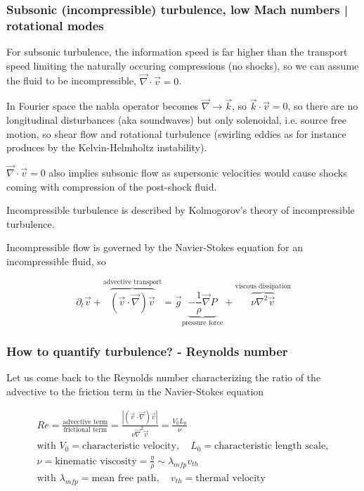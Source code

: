 \subsubsection{Subsonic (incompressible) turbulence, low Mach numbers | rotational modes}
For subsonic turbulence, the information speed is far higher than the transport speed limiting
the naturally occuring compressions (no shocks), so we can assume the fluid to be incompressible, $\vec{\nabla} \cdot \vec{v} = 0$.

In Fourier space the nabla operator becomes $\vec{\nabla} \rightarrow \vec{k}$, so $\vec{k} \cdot \vec{v} = 0$, so there
are no longitudinal disturbances (aka soundwaves) but only solenoidal, i.e. source free motion, so shear flow and rotational turbulence
(swirling eddies as for instance produces by the Kelvin-Helmholtz instability).

$\vec{\nabla} \cdot \vec{v} = 0$ also implies subsonic flow as supersonic velocities would cause shocks coming with compression of the post-shock fluid.

\textcolor{blue1}{Incompressible turbulence is described by Kolmogorov's theory of incompressible turbulence}.

Incompressible flow is governed by the Navier-Stokes equation for an incompressible fluid, so

\begin{equation}
    \partial_t \vec{v} + \overbrace{(\vec{v} \cdot \vec{\nabla}) \vec{v}}^{\text{advective transport}} = \vec{g} \underbrace{- \frac{1}{\rho} \vec{\nabla} P}_{\text{pressure force}} + \overbrace{\nu \nabla^2 \vec{v}}^{\text{viscous dissipation}}
\end{equation}

\subsubsection{How to quantify turbulence? - Reynolds number}
Let us come back to the Reynolds number characterizing the ratio of the advective to the friction term in the Navier-Stokes equation

\begin{equation}
    \begin{gathered}
        Re = \frac{\text{advective term}}{\text{frictional term}} = \frac{|(\vec{v}\cdot \vec{\nabla})\vec{v}|}{\nu \vec{\nabla}^2 \vec{v}} = \frac{V_0 L_0}{\nu} \\
        \text{with } V_0 = \text{characteristic velocity}, \quad L_0 = \text{characteristic length scale}, \\ \nu = \text{kinematic viscosity} = \frac{\eta}{\rho} \sim \lambda_{mfp} v_{th} \\
        \text{with } \lambda_{mfp} = \text{mean free path}, \quad v_{th} = \text{thermal velocity}
    \end{gathered}
\end{equation}

